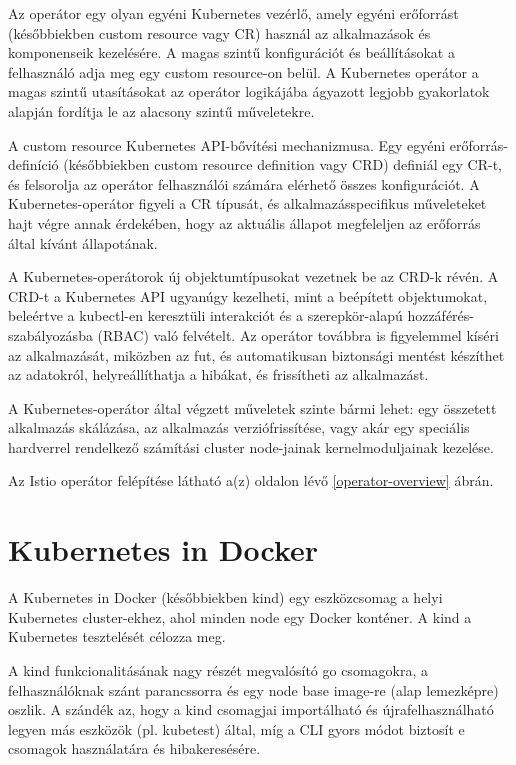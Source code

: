 Az operátor egy olyan egyéni Kubernetes vezérlő, amely egyéni erőforrást (későbbiekben custom resource vagy CR) használ az alkalmazások és komponenseik kezelésére. A magas szintű konfigurációt és beállításokat a felhasználó adja meg egy custom resource-on belül. A Kubernetes operátor a magas szintű utasításokat az operátor logikájába ágyazott legjobb gyakorlatok alapján fordítja le az alacsony szintű műveletekre.

A custom resource Kubernetes API-bővítési mechanizmusa. Egy egyéni erőforrás-definíció (későbbiekben custom resource definition vagy CRD) definiál egy CR-t, és felsorolja az operátor felhasználói számára elérhető összes konfigurációt. A Kubernetes-operátor figyeli a CR típusát, és alkalmazásspecifikus műveleteket hajt végre annak érdekében, hogy az aktuális állapot megfeleljen az erőforrás által kívánt állapotának.

A Kubernetes-operátorok új objektumtípusokat vezetnek be az CRD-k révén. A CRD-t a Kubernetes API ugyanúgy kezelheti, mint a beépített objektumokat, beleértve a kubectl-en keresztüli interakciót és a szerepkör-alapú hozzáférés-szabályozásba (RBAC) való felvételt. Az operátor továbbra is figyelemmel kíséri az alkalmazását, miközben az fut, és automatikusan biztonsági mentést készíthet az adatokról, helyreállíthatja a hibákat, és frissítheti az alkalmazást. 

A Kubernetes-operátor által végzett műveletek szinte bármi lehet: egy összetett alkalmazás skálázása, az alkalmazás verziófrissítése, vagy akár egy speciális hardverrel rendelkező számítási cluster node-jainak kernelmoduljainak kezelése.
\cite{RedHatKubOp}

Az Istio operátor felépítése látható a(z) \pageref{operator-overview} oldalon lévő \ref{operator-overview} ábrán.

\section{Kubernetes in Docker}
A Kubernetes in Docker (későbbiekben kind) egy eszközcsomag a helyi Kubernetes cluster-ekhez, ahol minden node egy Docker konténer. A kind a Kubernetes tesztelését célozza meg.

A kind funkcionalitásának nagy részét megvalósító go csomagokra, a felhasználóknak szánt parancssorra és egy node base image-re (alap lemezképre) oszlik. A szándék az, hogy a kind csomagjai importálható és újrafelhasználható legyen más eszközök (pl. kubetest) által, míg a CLI gyors módot biztosít e csomagok használatára és hibakeresésére.

